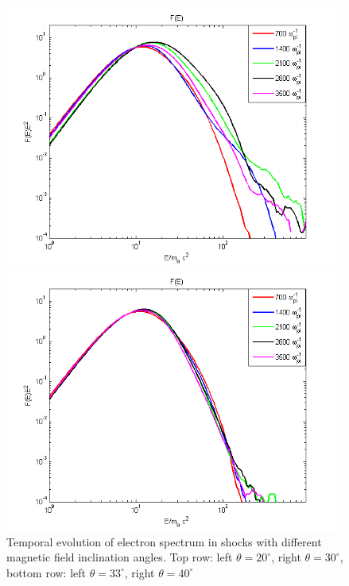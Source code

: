 \documentclass[a4paper]{jpconf}
\begin{document}
\begin{figure}[h!]
\begin{minipage}{0.48\textwidth}
			\includegraphics[width=0.98\textwidth]{fig/spectrum33.png} 
		\end{minipage}
		\begin{minipage}{0.48\textwidth}
			\centering
			\includegraphics[width=0.98\textwidth]{fig/spectrum40.png} 
		\end{minipage}
		\caption{Temporal evolution of electron spectrum in shocks with different magnetic field inclination angles. Top row: left $\theta = 20^\circ$, right $\theta = 30^\circ$, bottom row: left $\theta = 33^\circ$, right $\theta = 40^\circ$}
		\label{spectrume}
	\end{figure}
\end{document}
